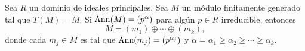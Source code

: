 

    
    



%

\begin{theorem}
Sea $R$ un dominio de ideales principales. 
Sea $M$ un módulo finitamente generado tal que $T(M)=M$. Si $\operatorname{Ann}(M)=(p^{\alpha})$ para algún $p\in R$ irreducible, entonces
\[
M=(m_1)\oplus\cdots\oplus (m_k),
\]
donde cada $m_j\in M$ es tal que $\operatorname{Ann}(m_j)=(p^{\alpha_j})$ y 
$\alpha=\alpha_1\geq\alpha_2\geq\cdots\geq\alpha_k$.
\end{theorem}

